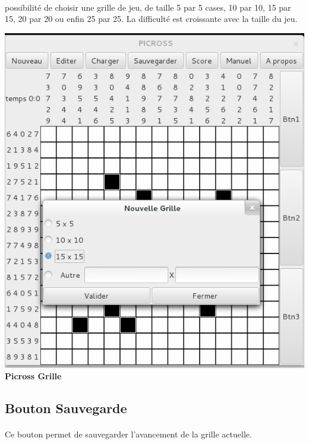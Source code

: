         \paragraph*{}
        possibilité de choisir une grille de jeu, de taille 5 par 5 cases, 10 par 10, 15 par 15, 20 par 20 ou enfin 25 par 25. La difficulté est croissante avec la taille du jeu.
        
        \begin{center}
                      \includegraphics[scale=0.6]{data/screenMaquette/NouvelleGrille.png}\\
                      \textbf{Picross Grille}
        \end{center}
        

         
        
        \subsection{Bouton Sauvegarde}      
              \paragraph*{}
              Ce bouton permet de sauvegarder l'avancement de la grille actuelle.
              
